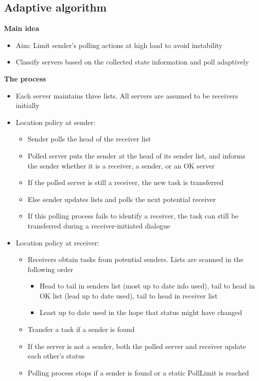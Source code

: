 \documentclass{article}[18pt]
\begin{document}
\subsection{Adaptive algorithm}
\textbf{Main idea}
\begin{itemize}
	\item Aim: Limit sender's polling actions at high load to avoid instability
	\item Classify servers based on the collected state information and poll adaptively
\end{itemize}
\textbf{The process}
\begin{itemize}
	\item Each server maintains three lists. All servers are assumed to be receivers initially
	\item Location policy at sender:
	\begin{itemize}
		\item Sender polls the head of the receiver list
		\item Polled server puts the sender at the head of its sender list, and informs the sender whether it is a receiver, a sender, or an OK server
		\item If the polled server is still a receiver, the new task is transferred
		\item Else sender updates lists and polls the next potential receiver
		\item If this polling process fails to identify a receiver, the task can still be transferred during a receiver-initiated dialogue
	\end{itemize}
	\item Location policy at receiver:
	\begin{itemize}
		\item Receivers obtain tasks from potential senders. Lists are scanned in the following order
		\begin{itemize}
			\item Head to tail in senders list (most up to date info used), tail to head in OK list (lead up to date used), tail to head in receiver list
			\item Least up to date used in the hope that status might have changed
		\end{itemize}
		\item Transfer a task if a sender is found
		\item If the server is not a sender, both the polled server and receiver update each other's status
		\item Polling process stops if a sender is found or a static PollLimit is reached
	\end{itemize}
\end{itemize}
\end{document}
